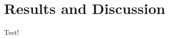\documentclass[report.tex]{subfiles}
\begin{document}
\section{Results and Discussion}
Test!
\end{document}
